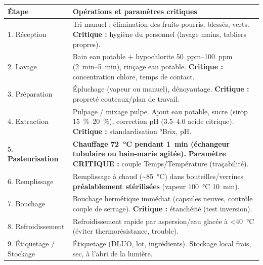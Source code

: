 \documentclass[11pt]{article}
\begin{document}
\begin{exoresolu}
\begin{center}
\begin{tabularx}{\linewidth}{|l|X|}
\hline
\rowcolor{popblueL} \textbf{Étape} & \textbf{Opérations et paramètres critiques} \\
\hline
1. Réception & Tri manuel : élimination des fruits pourris, blessés, verts. \textbf{Critique :} hygiène du personnel (lavage mains, tabliers propres). \\
\hline
2. Lavage & Bain eau potable + hypochlorite \SIrange{50}{100}{ppm} (\SIrange{2}{5}{min}), rinçage eau potable. \textbf{Critique :} concentration chlore, temps de contact. \\
\hline
3. Préparation & Épluchage (vapeur ou manuel), dénoyautage. \textbf{Critique :} propreté couteaux/plan de travail. \\
\hline
4. Extraction & Pulpage / mixage pulpe. Ajout eau potable, sucre (sirop \SIrange{15}{20}{\%}), correction pH (\numrange{3,5}{4,0} acide citrique). \textbf{Critique :} standardisation °Brix, pH. \\
\hline
5. \textbf{Pasteurisation} & \textbf{Chauffage \SI{72}{\celsius} pendant \SI{1}{min} (échangeur tubulaire ou bain-marie agitée).} \textbf{Paramètre CRITIQUE :} couple Temps/Température (traçabilité). \\
\hline
6. Remplissage & Remplissage à chaud (\textasciitilde \SI{85}{\celsius}) dans bouteilles/verrines \textbf{préalablement stérilisées} (vapeur \SI{100}{\celsius} \SI{10}{min}). \\
\hline
7. Bouchage & Bouchage hermétique immédiat (capsules neuves, contrôle couple de serrage). \textbf{Critique :} étanchéité (test inversion). \\
\hline
8. Refroidissement & Refroidissement rapide par aspersion/eau glacée à \textless \SI{40}{\celsius} (éviter thermorésistance, trouble). \\
\hline
9. Étiquetage / Stockage & Étiquetage (DLUO, lot, ingrédients). Stockage local frais, sec, à l'abri de la lumière. \\
\hline
\end{tabularx}
\end{center}


\end{exoresolu}
\end{document}

